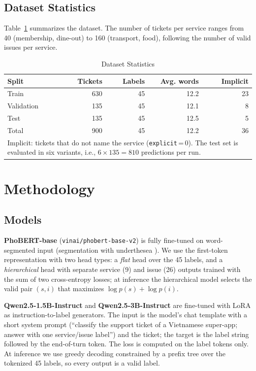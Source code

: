 \documentclass[conference]{IEEEtran}
\begin{document}
\subsection{Dataset Statistics}
Table~\ref{tab:data} summarizes the dataset. The number of tickets per
service ranges from 40 (membership, dine-out) to 160 (transport, food),
following the number of valid issues per service.

\begin{table}[htbp]
\caption{Dataset Statistics}
\label{tab:data}
\centering
\begin{tabular}{lrrrr}
\toprule
\textbf{Split} & \textbf{Tickets} & \textbf{Labels} & \textbf{Avg. words} & \textbf{Implicit} \\
\midrule
Train       & 630 & 45 & 12.2 & 23 \\
Validation  & 135 & 45 & 12.1 & 8 \\
Test        & 135 & 45 & 12.5 & 5 \\
\midrule
Total       & 900 & 45 & 12.2 & 36 \\
\bottomrule
\multicolumn{5}{p{0.92\columnwidth}}{\footnotesize Implicit: tickets that
do not name the service (\texttt{explicit}\,=\,0). The test set is
evaluated in six variants, i.e., $6\times135=810$ predictions per run.}
\end{tabular}
\end{table}

\section{Methodology}
\label{sec:method}

\subsection{Models}
\textbf{PhoBERT-base} (\texttt{vinai/phobert-base-v2})
\cite{nguyen2020phobert} is fully fine-tuned on word-segmented input
(segmentation with underthesea \cite{underthesea}). We use the first-token
representation with two head types: a \emph{flat} head over the 45 labels,
and a \emph{hierarchical} head with separate service (9) and issue (26)
outputs trained with the sum of two cross-entropy losses; at inference the
hierarchical model selects the valid pair $(s,i)$ that maximizes
$\log p(s)+\log p(i)$.

\textbf{Qwen2.5-1.5B-Instruct} and \textbf{Qwen2.5-3B-Instruct}
\cite{qwen2024qwen25} are fine-tuned with LoRA \cite{hu2022lora} as
instruction-to-label generators. The input is the model's chat template
with a short system prompt (``classify the support ticket of a Vietnamese
super-app; answer with one service/issue label'') and the ticket; the
target is the label string followed by the end-of-turn token. The loss is
computed on the label tokens only. At inference we use greedy decoding
constrained by a prefix tree over the tokenized 45 labels, so every output
is a valid label.
\end{document}
